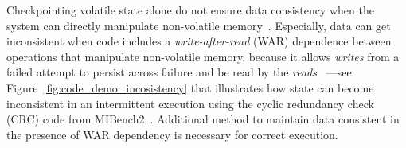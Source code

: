Checkpointing volatile state alone do not ensure data consistency when the system can directly manipulate non-volatile memory~\cite{mspcdino}.
Especially, data can get inconsistent when code includes a \emph{write-after-read} (WAR) dependence between operations that manipulate 
non-volatile memory, because it allows {\em writes} from a failed attempt to persist across failure and be read by the {\em reads}~\cite{ratchet,dino,alpaca}
---see Figure~\ref{fig:code_demo_incosistency} that illustrates how state can become inconsistent in an intermittent execution 
using the cyclic redundancy check (CRC) code from MIBench2~\cite{hicks_mibench2_2016}.
Additional method to maintain data consistent in the presence of WAR dependency is necessary for correct execution.


